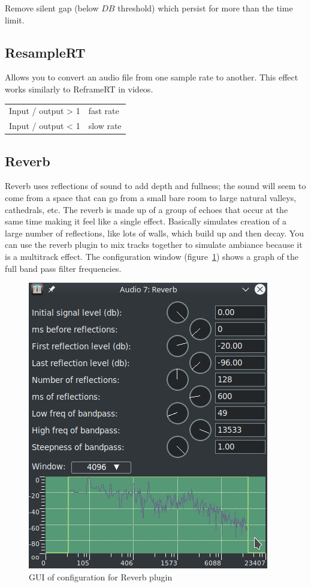 Remove silent gap (below $DB$ threshold) which persist for more than the time limit.

\subsection{ResampleRT}%
\label{sub:resamplert}

Allows you to convert an audio file from one sample rate to another. This effect works similarly to ReframeRT in videos.

\begin{center}
    \begin{tabular}{l l}
        \toprule
        Input / output > 1 &	fast rate \\
        Input / output < 1 &	slow rate \\        
        \bottomrule
    \end{tabular}
\end{center}

\subsection{Reverb}%
\label{sub:reverb}

Reverb uses reflections of sound to add depth and fullness; the sound will seem to come from a space that can go from a small bare room to large natural valleys, cathedrals, etc. The reverb is made up of a group of echoes that occur at the same time making it feel like a single effect. 
Basically simulates creation of a large number of reflections, like lots of walls, which build up and then decay. You can use the reverb plugin to mix tracks together to simulate ambiance because it is a multitrack effect.
The configuration window (figure~\ref{fig:reverb}) shows a graph of the full band pass filter frequencies.

\begin{figure}[htpb]
	\centering
	\includegraphics[width=0.5\linewidth]{images/reverb.png}
	\caption{GUI of configuration for Reverb plugin}
	\label{fig:reverb}
\end{figure}

